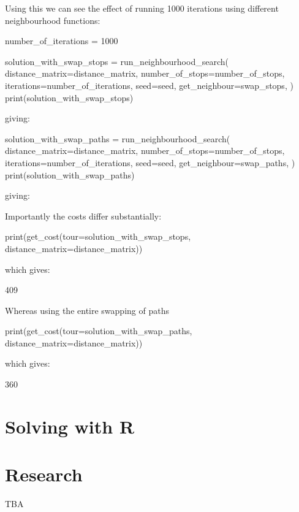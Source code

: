 Using this we can see the effect of running 1000 iterations using different
neighbourhood functions:


\begin{pyin}
number_of_iterations = 1000

solution_with_swap_stops = run_neighbourhood_search(
    distance_matrix=distance_matrix,
    number_of_stops=number_of_stops,
    iterations=number_of_iterations,
    seed=seed,
    get_neighbour=swap_stops,
)
print(solution_with_swap_stops)
\end{pyin}

giving:

\begin{pyout}
[0, 2, 4, 17, 6, 10, 7, 14, 8, 9, 5, 15, 1, 16, 3, 12, 13, 11, 0]
\end{pyout}

\begin{pyin}
solution_with_swap_paths = run_neighbourhood_search(
    distance_matrix=distance_matrix,
    number_of_stops=number_of_stops,
    iterations=number_of_iterations,
    seed=seed,
    get_neighbour=swap_paths,
)
print(solution_with_swap_paths)
\end{pyin}

giving:

\begin{pyout}
[0, 13, 12, 3, 16, 1, 5, 9, 8, 15, 14, 7, 10, 6, 17, 4, 2, 11, 0]
\end{pyout}

Importantly the costs differ substantially:

\begin{pyin}
print(get_cost(tour=solution_with_swap_stops, distance_matrix=distance_matrix))
\end{pyin}

which gives:

\begin{pyout}
409
\end{pyout}

Whereas using the entire swapping of paths %

\begin{pyin}
print(get_cost(tour=solution_with_swap_paths, distance_matrix=distance_matrix))
\end{pyin}

which gives:

\begin{pyout}
360
\end{pyout}


\section{Solving with R}\label{sec:solving-with-R}

\section{Research}\label{sec:research}

TBA
